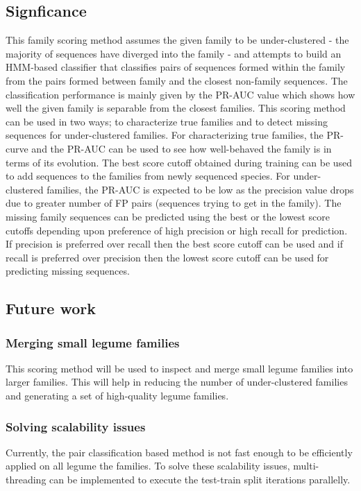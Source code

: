\documentclass{article}
\begin{document}
		\subsection{Signficance}
		This family scoring method assumes the given family to be under-clustered - the majority of sequences have diverged into the family - and attempts to build an HMM-based classifier that classifies pairs of sequences formed within the family from the pairs formed between family and the closest non-family sequences. The classification performance is mainly given by the PR-AUC value which shows how well the given family is separable from the closest families. This scoring method can be used in two ways; to characterize true families and to detect missing sequences for under-clustered families. For characterizing true families, the PR-curve and the PR-AUC can be used to see how well-behaved the family is in terms of its evolution. The best score cutoff obtained during training can be used to add sequences to the families from newly sequenced species. For under-clustered families, the PR-AUC is expected to be low as the precision value drops due to greater number of FP pairs (sequences trying to get in the family). The missing family sequences can be predicted using the best or the lowest score cutoffs depending upon preference of  high precision or high recall for prediction. If precision is preferred over recall then the best score cutoff can be used and if recall is preferred over precision then the lowest score cutoff can be used for predicting missing sequences.
		
		\subsection{Future work}
			\subsubsection{Merging small legume families}
			This scoring method will be used to inspect and merge small legume families into larger families. This will help in reducing the number of under-clustered families and generating a set of high-quality legume families.
			\subsubsection{Solving scalability issues}
			Currently, the pair classification based method is not fast enough to be efficiently applied on all legume the families. To solve these scalability issues, multi-threading can be implemented to execute the test-train split iterations parallelly. 
			
\end{document}
